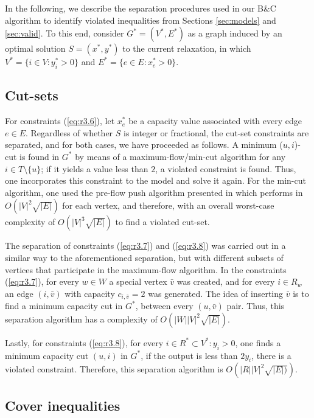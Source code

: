 \documentclass{singlecol-new}
\theoremstyle{TH}{
\newtheorem{lemma}{Lemma}
\newtheorem{theorem}[lemma]{Theorem}
\newtheorem{corrolary}[lemma]{Corrolary}
\newtheorem{conjecture}[lemma]{Conjecture}
\newtheorem{proposition}[lemma]{Proposition}
\newtheorem{claim}[lemma]{Claim}
\newtheorem{stheorem}[lemma]{Wrong Theorem}
}
\theoremstyle{THrm}{
\newtheorem{definition}{Definition}[section]
\newtheorem{question}{Question}[section]
\newtheorem{remark}{Remark}
\newtheorem{scheme}{Scheme}
}
\theoremstyle{THhit}{
\newtheorem{case}{Case}[section]
}
\begin{document}
In the following, we describe the separation procedures used in our B\&C algorithm to identify violated inequalities from Sections \ref{sec:models} and \ref{sec:valid}. To this end, consider $G^*=(V^*,E^*)$ 
as a graph induced by an optimal solution $S=(x^*,y^*)$  to the current relaxation, in which  $V^* = \{i \in V : y_i^* > 0\}$ and $E^* = \{e \in E : x_e^* >0 \}$.

\subsection{Cut-sets}
For constraints  (\ref{eq:r3.6}), let $x^*_e$ be a capacity value associated with every edge $e \in E$.
Regardless of whether $S$ is integer or fractional, the cut-set constraints are separated, and for both cases, we have proceeded as follows. A minimum ($u, i$)-cut is found in $G^*$ by means of a maximum-flow/min-cut algorithm for  any $i \in T\setminus\{u\}$; if it yields a value less than $2$, a violated constraint is found. Thus, one incorporates  this constraint to the model and solve it again. For the min-cut algorithm, one used the pre-flow push algorithm presented in \citet{ciupala2008preflow} which performs in $O(|V|^2 \sqrt{|E|})$ for each vertex, and therefore, with an overall worst-case complexity of $O(|V|^3 \sqrt{|E|})$ to find a violated cut-set.



The separation of constraints (\ref{eq:r3.7}) and (\ref{eq:r3.8}) was carried out in a similar way to the aforementioned separation, but with different subsets of vertices that participate in the maximum-flow algorithm. In the constraints (\ref{eq:r3.7}), for every $w \in W$ a special vertex $\bar{v}$ was created, and for every $i \in R_w$ an edge $(i,\bar{v})$ with capacity $c_{i,\bar{v}}=2$ was generated. The idea of inserting $\bar{v}$ is to find a minimum capacity cut in $G^*$, between every  $(u,\bar{v})$ pair. Thus,  this separation algorithm has a complexity of  $O(|W||V|^2\sqrt{|E|})$.

Lastly, for constraints (\ref{eq:r3.8}), for every $i \in R^* \subset V^*: y_i > 0$, one finds a minimum capacity cut $(u,i)$ in $G^*$, if the output is less than $2y_i$, there is a violated constraint. Therefore, this separation algorithm is  $O(|R||V|^2\sqrt{|E|)})$.

\subsection{Cover inequalities}
\end{document}
